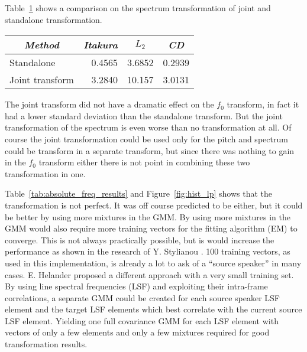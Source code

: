 Table~\ref{tab:spectrum_joint_transform} shows a comparison on the spectrum transformation of joint and standalone transformation.
\begin{table}[htbp]
	\begin{center}
		\label{tab:spectrum_joint_transform}
		\begin{tabular}{lrrr}
			\toprule
			\multicolumn{1}{c}{\emph{Method}} & \multicolumn{1}{c}{\emph{Itakura}} & \multicolumn{1}{c}{\emph{$L_2$}} & \multicolumn{1}{c}{\emph{CD}}\\
			\midrule
			Standalone & 0.4565 & 3.6852 & 0.2939 \\
			Joint transform & 3.2840 & 10.157 & 3.0131 \\
			\bottomrule			
		\end{tabular}		
	\end{center}	
\end{table}
The joint transform did not have a dramatic effect on the $f_0$ transform, in fact it had a lower standard deviation than the standalone transform. But the joint transformation of the spectrum is even worse than no transformation at all. Of course the joint transformation could be used only for the pitch and spectrum could be transform in a separate transform, but since there was nothing to gain in the $f_0$ transform either there is not point in combining these two transformation in one.

Table~\ref{tab:absolute_freq_results} and Figure~\ref{fig:hist_lp} shows that the transformation is not perfect. It was off course predicted to be either, but it could be better by using more mixtures in the GMM. By using more mixtures in the GMM would also require more training vectors for the fitting algorithm (EM) to converge. This is not always practically possible, but is would increase the performance as shown in the research of Y. Stylianou \etal \cite{stylianou98}. 100 training vectors, as used in this implementation, is already a lot to ask of a ``source speaker'' in many cases. E. Helander \etal \cite{helander08} proposed a different approach with a very small training set. By using line spectral frequencies (LSF) and exploiting their intra-frame correlations, a separate GMM could be created for each source speaker LSF element and the target LSF elements which best correlate with the current source LSF element. Yielding one full covariance GMM for each LSF element with vectors of only a few elements and only a few mixtures required for good transformation results.

